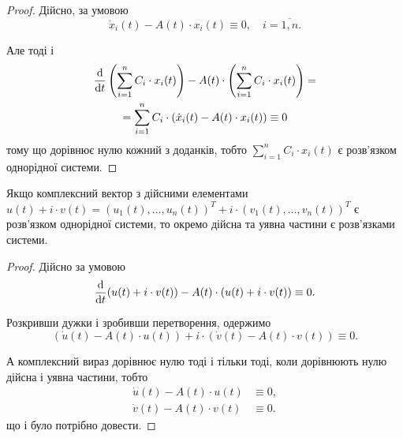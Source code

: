 \begin{proof}
	Дійсно, за умовою
	\begin{equation*}
		\dot x_i(t) - A(t) \cdot x_i(t) \equiv 0, \quad i = \overline{1, n}.
	\end{equation*}
	
	Але тоді і
	\begin{multline*}
		\frac{\mathop{}\!\mathrm{d}}{\mathop{}\!\mathrm{d} t} \left( \sum_{i=1}^n C_i \cdot x_i(t) \right) - A(t) \cdot \left( \sum_{i = 1}^n C_i \cdot x_i(t) \right) = \\ = \sum_{i = 1}^n C_i \cdot \left( \dot x_i(t) - A(t) \cdot x_i(t) \right) \equiv 0
	\end{multline*}
	тому що дорівнює нулю кожний з доданків, тобто $\sum_{i=1}^n C_i \cdot x_i(t)$ є роз\-в'яз\-ком однорідної системи.
\end{proof}

\begin{property}
	Якщо комплексний вектор з дійсними елементами $u(t) + i \cdot v(t) = (u_1(t), \ldots, u_n(t))^T + i \cdot (v_1(t), \ldots, v_n(t))^T$ є розв'язком однорідної системи, то окремо дійсна та уявна частини є розв'язками системи.
\end{property}

\begin{proof}
	Дійсно за умовою
	\begin{equation*}
		\frac{\mathop{}\!\mathrm{d}}{\mathop{}\!\mathrm{d} t} (u(t) + i \cdot v(t)) - A(t) \cdot (u(t) + i \cdot v(t)) \equiv 0.
	\end{equation*}

	Розкривши дужки і зробивши перетворення, одержимо
	\begin{equation*}
		(\dot u(t) - A(t) \cdot u(t)) + i \cdot (\dot v(t) - A(t) \cdot v(t)) \equiv 0.
	\end{equation*}
	 
	А комплексний вираз дорівнює нулю тоді і тільки тоді, коли дорівнюють нулю дійсна і уявна частини, тобто
	\begin{align*}
		\dot u(t) - A(t) \cdot u(t) &\equiv 0, \\
		\dot v(t) - A(t) \cdot v(t) &\equiv 0.
	\end{align*}
	що і було потрібно довести.
\end{proof}

